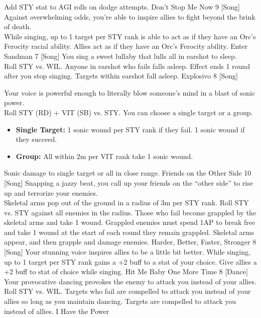 \begin{path}
{Add STY stat to AGI rolls on dodge attempts.}
\skilldescription
{Don't Stop Me Now}
{9}
[Song]
{Against overwhelming odds, you're able to inspire allies to fight beyond the brink of death.
\\While singing, up to 1 target per STY rank is able to act as if they have an Orc's Ferocity racial ability.}
{Allies act as if they have an Orc’s Ferocity ability.}
\skilldescription
{Enter Sandman}
{7}
[Song]
{You sing a sweet lullaby that lulls all in earshot to sleep.
\\Roll STY vs. WIL. Anyone in earshot who fails falls asleep. Effect ends 1 round after you stop singing.}
{Targets within earshot fall asleep.}
\skilldescription
{Explosivo}
{8}
[Song]
{Your voice is powerful enough to literally blow someone's mind in a blast of sonic power.
\\Roll STY (RD) + VIT (SB) vs. STY. You can choose a single target or a group.
\begin{itemize}
\item \textbf{Single Target:}  1 sonic wound per STY rank if they fail. 1 sonic wound if they succeed.
\item \textbf{Group:}  All within 2m per VIT rank take 1 sonic wound.
\end{itemize}
}
{Sonic damage to single target or all in close range.}
\skilldescription
{Friends on the Other Side}
{10}
[Song]
{Snapping a jazzy beat, you call up your friends on the “other side” to rise up and terrorize your enemies.
\\Skeletal arms pop out of the ground in a radius of 3m per STY rank. Roll STY vs. STY against all enemies in the radius. Those who fail become grappled by the skeletal arms and take 1 wound. Grappled enemies must spend 1AP to break free and take 1 wound at the start of each round they remain grappled.}
{Skeletal arms appear, and then grapple and damage enemies.}
\skilldescription
{Harder, Better, Faster, Stronger}
{8}
[Song]
{Your stunning voice inspires allies to be a little bit better. While singing, up to 1 target per STY rank gains a +2 buff to a stat of your choice.}
{Give allies a +2 buff to stat of choice while singing.}
\skilldescription
{Hit Me Baby One More Time}
{8}
[Dance]
{Your provocative dancing provokes the enemy to attack you instead of your allies.
\\Roll STY vs. WIL. Targets who fail are compelled to attack you instead of your allies so long as you maintain dancing.}
{Targets are compelled to attack you instead of allies.}
\skilldescription
{I Have the Power}

\end{path}
